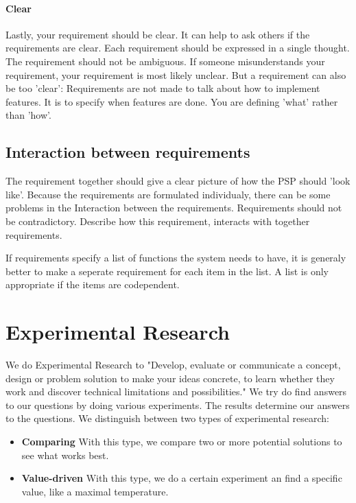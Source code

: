\documentclass[10pt]{report}
\begin{document}
\paragraph{Clear}

Lastly, your requirement should be clear. It can help to ask others if the requirements are clear. Each requirement should be expressed in a single thought. The requirement should not be ambiguous. If someone misunderstands your requirement, your requirement is most likely unclear. But a requirement can also be too 'clear': Requirements are not made to talk about how to implement features. It is to specify when features are done. You are defining 'what' rather than 'how'.

\subsection{Interaction between requirements}

The requirement together should give a clear picture of how the PSP should 'look like'. Because the requirements are formulated individualy, there can be some problems in the Interaction between the requirements. Requirements should not be contradictory. Describe how this requirement, interacts with together requirements. 

If requirements specify a list of functions the system needs to have, it is generaly better to make a seperate requirement for each item in the list. A list is only appropriate if the items are codependent.

\newpage

\section{Experimental Research}

We do Experimental Research to "Develop, evaluate or communicate a concept, design or problem solution to make your ideas concrete, to learn whether they work and discover technical limitations and possibilities." We try do find answers to our questions by doing various experiments. The results determine our answers to the questions. We distinguish between two types of experimental research:

\begin{itemize}
	\item \textbf{Comparing} With this type, we compare two or more potential solutions to see what works best.
	\item \textbf{Value-driven} With this type, we do a certain experiment an find a specific value, like a maximal temperature.
\end{itemize}
\end{document}
